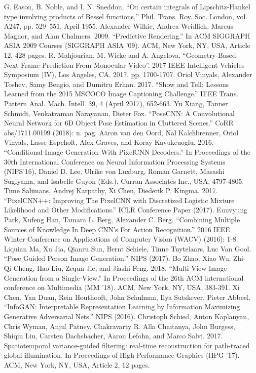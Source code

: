 \documentclass[conference]{IEEEtran}
\begin{document}
\begin{thebibliography}{12}
 G. Eason, B. Noble, and I. N. Sneddon, ``On certain integrals of Lipschitz-Hankel type involving products of Bessel functions,'' Phil. Trans. Roy. Soc. London, vol. A247, pp. 529--551, April 1955.
 Alexander Wilkie, Andrea Weidlich, Marcus Magnor, and Alan Chalmers. 2009. ``Predictive Rendering.'' In ACM SIGGRAPH ASIA 2009 Courses (SIGGRAPH ASIA '09). ACM, New York, NY, USA, Article 12, 428 pages.
 R. Mahjourian, M. Wicke and A. Angelova, ``Geometry-Based Next Frame Prediction From Monocular Video''. 2017 IEEE Intelligent Vehicles Symposium (IV), Los Angeles, CA, 2017, pp. 1700-1707.
 Oriol Vinyals, Alexander Toshev, Samy Bengio, and Dumitru Erhan. 2017. ``Show and Tell: Lessons Learned from the 2015 MSCOCO Image Captioning Challenge.'' IEEE Trans. Pattern Anal. Mach. Intell. 39, 4 (April 2017), 652-663.
 Yu Xiang, Tanner Schmidt, Venkatraman Narayanan, Dieter Fox. ``PoseCNN: A Convolutional Neural Network for 6D Object Pose Estimation in Cluttered Scenes.'' CoRR abs/1711.00199 (2018): n. pag.
 A\"{a}ron van den Oord, Nal Kalchbrenner, Oriol Vinyals, Lasse Espeholt, Alex Graves, and Koray Kavukcuoglu. 2016. ``Conditional Image Generation With PixelCNN Decoders.'' In Proceedings of the 30th International Conference on Neural Information Processing Systems (NIPS'16), Daniel D. Lee, Ulrike von Luxburg, Roman Garnett, Masashi Sugiyama, and Isabelle Guyon (Eds.). Curran Associates Inc., USA, 4797-4805.
 Time Salimans, Andrej Karpathy, Xi Chen, Diederik P. Kingma. 2017. ``PixelCNN++: Improving The PixelCNN with Discretized Logistic Mixture Likelihood and Other Modifications.'' ICLR Conference Paper (2017).
 Eunvyung Park, Xufeng Han, Tamara L. Berg, Alexander C. Berg. ``Combining Multiple Sources of Knowledge In Deep CNN's For Action Recognition.'' 2016 IEEE Winter Conference on Applications of Computer Vision (WACV) (2016): 1-8.
 Liquian Ma, Xu Jia, Qianru Sun, Bernt Schiele, Tinne Tuytelaars, Luc Van Gool. ``Pose Guided Person Image Generation.'' NIPS (2017).
 Bo Zhao, Xiao Wu, Zhi-Qi Cheng, Hao Liu, Zequn Jie, and Jiashi Feng. 2018. ``Multi-View Image Generation from a Single-View.'' In Proceedings of the 26th ACM international conference on Multimedia (MM '18). ACM, New York, NY, USA, 383-391.
 Xi Chen, Yan Duan, Rein Houthooft, John Schulman, Ilya Sutskever, Pieter Abbeel. ``InfoGAN: Interpretable Representation Learning by Information Maximizing Generative Adversarial Nets.'' NIPS (2016).
 Christoph Schied, Anton Kaplanyan, Chris Wyman, Anjul Patney, Chakravarty R. Alla Chaitanya, John Burgess, Shiqiu Liu, Carsten Dachsbacher, Aaron Lefohn, and Marco Salvi. 2017. Spatiotemporal variance-guided filtering: real-time reconstruction for path-traced global illumination. In Proceedings of High Performance Graphics (HPG '17). ACM, New York, NY, USA, Article 2, 12 pages.
\end{thebibliography}
\end{document}
